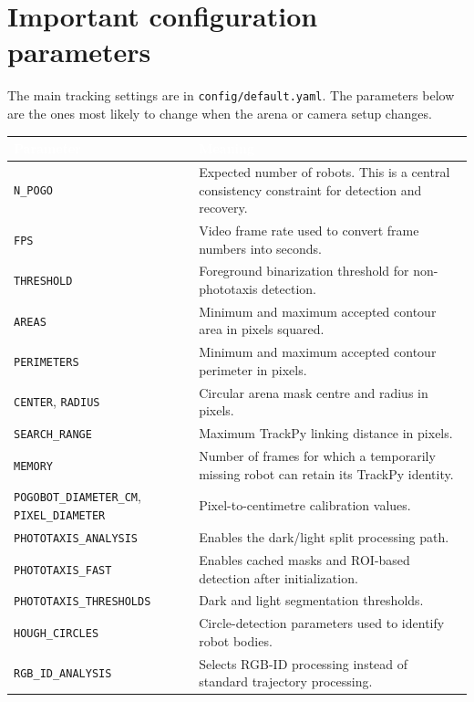 \documentclass[11pt,a4paper]{article}
\begin{document}
\section{Important configuration parameters}

The main tracking settings are in \texttt{config/default.yaml}. The parameters below are the ones most likely to change when the arena or camera setup changes.

\begingroup
\renewcommand{\arraystretch}{1.18}
\small
{}
\begin{tabularx}{\linewidth}{@{}>{\ttfamily\raggedright\arraybackslash}p{42mm}X@{}}
\toprule
\rowcolor{PogoGreen}
\textcolor{white}{\textbf{Parameter}} & \textcolor{white}{\textbf{Meaning}} \\
\midrule
\texttt{N\_POGO} & Expected number of robots. This is a central consistency constraint for detection and recovery. \\
\texttt{FPS} & Video frame rate used to convert frame numbers into seconds. \\
\texttt{THRESHOLD} & Foreground binarization threshold for non-phototaxis detection. \\
\texttt{AREAS} & Minimum and maximum accepted contour area in pixels squared. \\
\texttt{PERIMETERS} & Minimum and maximum accepted contour perimeter in pixels. \\
\texttt{CENTER}, \texttt{RADIUS} & Circular arena mask centre and radius in pixels. \\
\texttt{SEARCH\_RANGE} & Maximum TrackPy linking distance in pixels. \\
\texttt{MEMORY} & Number of frames for which a temporarily missing robot can retain its TrackPy identity. \\
\texttt{POGOBOT\_DIAMETER\_CM}, \texttt{PIXEL\_DIAMETER} & Pixel-to-centimetre calibration values. \\
\texttt{PHOTOTAXIS\_ANALYSIS} & Enables the dark/light split processing path. \\
\texttt{PHOTOTAXIS\_FAST} & Enables cached masks and ROI-based detection after initialization. \\
\texttt{PHOTOTAXIS\_THRESHOLDS} & Dark and light segmentation thresholds. \\
\texttt{HOUGH\_CIRCLES} & Circle-detection parameters used to identify robot bodies. \\
\texttt{RGB\_ID\_ANALYSIS} & Selects RGB-ID processing instead of standard trajectory processing. \\
\bottomrule
\end{tabularx}
\endgroup
\end{document}
